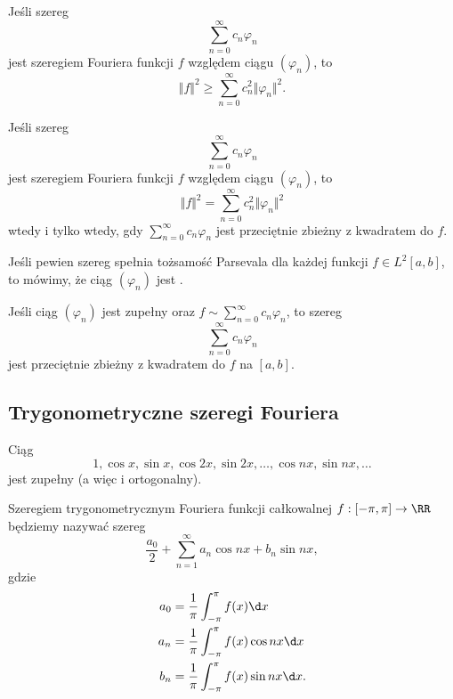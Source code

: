 \begin{theorem}
    Jeśli szereg
    \[ \sum_{n=0}^\infty c_n\varphi_n \]
    jest szeregiem Fouriera funkcji $f$ względem ciągu $(\varphi_n)$, to
    \[ \Vert f \Vert^2 \geq \sum_{n=0}^\infty c_n^2 \Vert \varphi_n \Vert^2. \]
\end{theorem}

\begin{theorem}
    \label{t:Parseval}
    Jeśli szereg
    \[ \sum_{n=0}^\infty c_n\varphi_n \]
    jest szeregiem Fouriera funkcji $f$ względem ciągu $(\varphi_n)$, to
    \[ \Vert f \Vert^2 = \sum_{n=0}^\infty c_n^2 \Vert \varphi_n \Vert^2 \]
    wtedy i tylko wtedy, gdy $\sum_{n=0}^\infty c_n\varphi_n$ jest przeciętnie zbieżny z kwadratem do $f$.
\end{theorem}

Jeśli pewien szereg spełnia tożsamość Parsevala dla każdej funkcji $f \in L^2[a, b]$, to mówimy, że ciąg $(\varphi_n)$ jest .

\begin{corollary}
    Jeśli ciąg $(\varphi_n)$ jest zupełny oraz $f \sim \sum_{n=0}^\infty c_n\varphi_n$, to szereg
    \[ \sum_{n=0}^\infty c_n\varphi_n \]
    jest przeciętnie zbieżny z kwadratem do $f$ na $[a, b]$.
\end{corollary}

\subsection{Trygonometryczne szeregi Fouriera}
\begin{fact}
    Ciąg
    \[ 1, \cos x, \sin x, \cos 2x, \sin 2x, \ldots, \cos nx, \sin nx, \ldots \]
    jest zupełny (a więc i ortogonalny).
\end{fact}

\begin{corollary}
    \label{c:Euler-Fourier for trig}
    Szeregiem trygonometrycznym Fouriera funkcji całkowalnej $f : [-\pi, \pi] \to \RR$ będziemy nazywać szereg
    \[ \frac{a_0}{2} + \sum_{n=1}^\infty a_n\cos nx + b_n\sin nx, \]
    gdzie
    \begin{align*}
        a_0 &= \frac{1}{\pi}\int_{-\pi}^\pi f(x) \d x \\
        a_n &= \frac{1}{\pi}\int_{-\pi}^\pi f(x)\cos nx \d x \\
        b_n &= \frac{1}{\pi}\int_{-\pi}^\pi f(x)\sin nx \d x.
    \end{align*}
\end{corollary}

